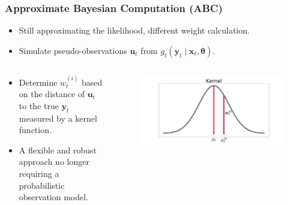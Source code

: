 \documentclass{beamer}
\newcommand{\bx}{\bm{x}}
\newcommand{\by}{\bm{y}}
\newcommand{\bu}{\bm{u}}
\newcommand{\btheta}{\bm{\theta}}
\newcommand{\obs}{g}
\begin{document}
    \begin{frame}
    \frametitle{Approximate Bayesian Computation (ABC)}
    \begin{itemize}
        \item Still approximating the likelihood, different weight calculation.
        \item Simulate pseudo-observations $\bu_t$ from $\obs_t(\by_t \mid \bx_t, \btheta)$.
    \end{itemize}
    
    \begin{columns}
        \begin{column}{0.44\textwidth}
            \begin{itemize}
                \item Determine $w_t^{(i)}$ based on the distance of $\bu_t$ to the true $\by_t$ measured by a kernel function.
                \item A flexible and robust approach no longer requiring a probabilistic observation model.
            \end{itemize}
        \end{column}
%
        \begin{column}{0.47\textwidth}
            \begin{figure}
                \centering
                \includegraphics[width=\columnwidth]{images/kernel}
            \end{figure}
        \end{column}
    \end{columns}
    \end{frame}
\end{document}
